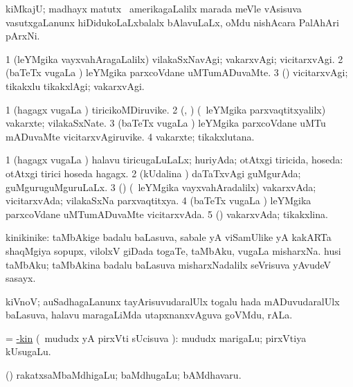 \bentry
{}
\gl{\nA}
\bmng
kiMkajU; madhayx matutx \da\ amerikagaLalilx marada meVle vAsisuva vasutxgaLanunx hiDidukoLaLxbalalx bAlavuLaLx, oMdu nishAcara PalAhAri pArxNi.  
\emng
\eentry

\bentry
{}
\gl{\kirxvi}
\bmng
\bnum
\num{1} (leYMgika vayxvahAragaLalilx) vilakaSxNavAgi; vakarxvAgi; vicitarxvAgi. 
\num{2} (baTeTx \mo vugaLa \vi) leYMgika parxcoVdane uMTumADuvaMte. 
\num{3} (\rUpa) vicitarxvAgi; tikakxlu tikakxlAgi; vakarxvAgi. 
\enum
\emng
\eentry

\bentry
{}
\gl{\nA}
\bmng
\bnum
\num{1} (hagagx \mo vugaLa \vi) tiricikoMDiruvike. 
\num{2} (\rUpa, \AmA) (\kanmu\ leYMgika parxvaqtitxyalilx) vakarxte; vilakaSxNate. 
\num{3} (baTeTx \mo vugaLa \vi) leYMgika parxcoVdane uMTu mADuvaMte vicitarxvAgiruvike. 
\num{4} vakarxte; tikakxlutana. 
\enum
\emng
\eentry

\bentry
{}
\gl{\gu}
\bmng
\bnum
\num{1} (hagagx \mo vugaLa \vi) halavu tiricugaLuLaLx; huriyAda; otAtxgi tiricida, hoseda:  otAtxgi tirici hoseda hagagx. 
\num{2} (kUdalina \vi) daTaTxvAgi guMgurAda; guMguruguMguruLaLx. 
\num{3} (\AmA) (\kanmu\ leYMgika vayxvahAradalilx) vakarxvAda; vicitarxvAda; vilakaSxNa parxvaqtitxya. 
\num{4} (baTeTx \mo vugaLa \vi) leYMgika parxcoVdane uMTumADuvaMte vicitarxvAda. 
\num{5} (\rUpa) vakarxvAda; tikakxlina. 
\enum
\emng
\eentry

\bentry
{}
\gl{\nA}
\bmng
kinikinike: 
\banum
{} taMbAkige badalu baLasuva, sabale yA viSamUlike yA kakARTa shaqMgiya sopupx, vilolxV giDada togaTe, taMbAku, \mo vugaLa misharxNa. 
 husi taMbAku; taMbAkina badalu baLasuva misharxNadalilx seVrisuva yAvudeV sasayx. 
\eanum
\emng
\eentry

\bentry
{}
\gl{\nA}
\bmng
kiVnoV; auSadhagaLanunx tayArisuvudaralUlx togalu hada mADuvudaralUlx baLasuva, halavu maragaLiMda utapxnanxvAguva goVMdu, rALa. 
\emng
\eentry

\bentry
{}
\gl{\uparx}
\bmng
= \hyperlink{hyp-kin}{-kin} (\kanmu\ mududx yA pirxVti sUcisuva \uparx):  mududx marigaLu; pirxVtiya kUsugaLu. 
\emng
\eentry

\bentry
{}
\gl{\nA}
\bmng
(\bava) rakatxsaMbaMdhigaLu; baMdhugaLu; bAMdhavaru. 
\emng
\eentry

